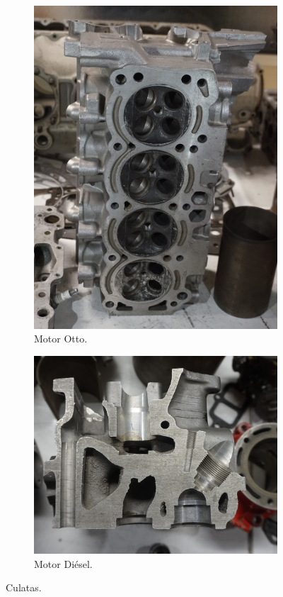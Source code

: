 \begin{figure}[H]
    \centering
    \begin{subfigure}[b]{0.45\textwidth}
        \centering
        \includegraphics[width=0.65\linewidth]{Figures/02/m3/petrol_head.jpg}
        \caption{Motor Otto.}
        \label{fig:C_gas}
    \end{subfigure}
    \hfill
    \begin{subfigure}[b]{0.45\textwidth}
        \centering
        \includegraphics[width=\linewidth]{Figures/02/m3/diesel_head.jpg}
        \caption{Motor Diésel.}
        \label{fig:C_diesel}
    \end{subfigure}    
    \caption{Culatas.}
    \label{fig:C_combined}
\end{figure}

